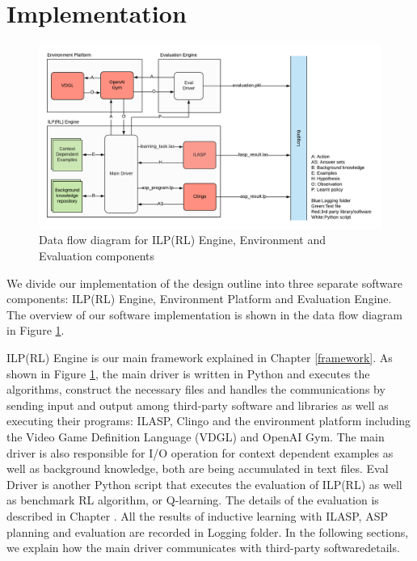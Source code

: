 
\section{Implementation}
\begin{figure}[!htb]
\centering
\includegraphics[width=1.0\textwidth]{./figures/ILPRL_dataflow}
\caption{Data flow diagram for ILP(RL) Engine, Environment and Evaluation components}
\label{fig:dataflow}
\end{figure}
We divide our implementation of the design outline into three separate software components: ILP(RL) Engine, Environment Platform and Evaluation Engine. The overview of our software implementation is shown in the data flow diagram in Figure \ref{fig:dataflow}. 

ILP(RL) Engine is our main framework explained in Chapter \ref{framework}. As shown in Figure \ref{fig:dataflow}, the main driver is written in Python and executes the algorithms, construct the necessary files and handles the communications by sending input and output among third-party software and libraries as well as executing their programs: ILASP, Clingo and the environment platform including the Video Game Definition Language (VDGL) and OpenAI Gym. The main driver is also responsible for I/O operation for context dependent examples as well as background knowledge, both are being accumulated in text files. Eval Driver is another Python script that executes the evaluation of ILP(RL) as well as benchmark RL algorithm, or Q-learning. The details of the evaluation is described in Chapter \label{evaluation}. All the results of inductive learning with ILASP, ASP planning and evaluation are recorded in Logging folder.
In the following sections, we explain how the main driver communicates with third-party softwaredetails.

